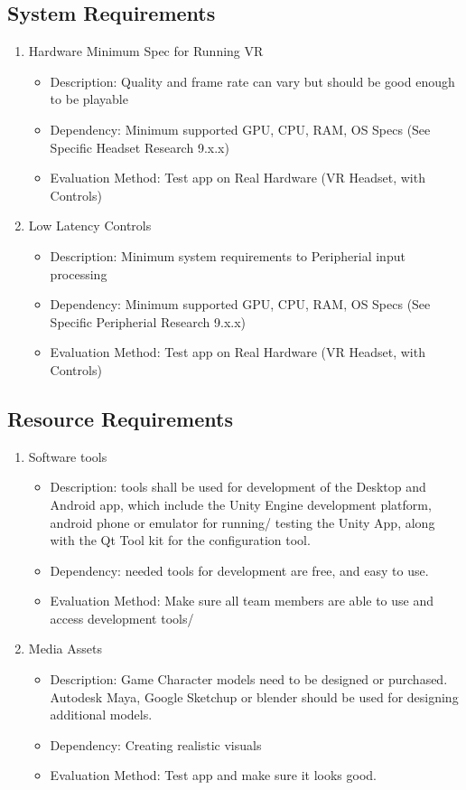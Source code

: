 \documentclass[a4paper,10pt]{article}
\begin{document}
	\subsection{System Requirements}
	\begin{enumerate}
	 \item Hardware Minimum Spec for Running VR
	 \begin{itemize}
	  \item Description: Quality and frame rate can vary but should be good enough to be playable
	  \item Dependency: Minimum supported GPU, CPU, RAM, OS Specs (See Specific Headset Research 9.x.x) 
	  \item Evaluation Method: Test app on Real Hardware (VR Headset, with Controls)
	 \end{itemize}
	 \item Low Latency Controls
	 \begin{itemize}
	  \item Description: Minimum system requirements to Peripherial input processing
	  \item Dependency: Minimum supported GPU, CPU, RAM, OS Specs (See Specific Peripherial Research 9.x.x) 
	  \item Evaluation Method: Test app on Real Hardware (VR Headset, with Controls)
	 \end{itemize}
	\end{enumerate}
	
	\subsection{Resource Requirements}
	\begin{enumerate}
	 \item Software tools
	 \begin{itemize}
	 \item Description: tools shall be used for development of the Desktop and Android app, which include 
	 the Unity Engine development platform, android phone or emulator for running/ testing the Unity App,
	  along with the Qt Tool kit for the configuration tool.
	 \item  Dependency: needed tools for development are free, and easy to use. 
	 \item Evaluation Method: Make sure all team members are able to use and access development tools/
	  \end{itemize}
	 \item Media Assets
	\begin{itemize}
	  \item Description: Game Character models need to be designed or purchased. Autodesk Maya, Google Sketchup or blender should be used for designing additional models. 
	  \item Dependency: Creating realistic visuals 
	  \item Evaluation Method: Test app and make sure it looks good.
	 \end{itemize}
	\end{enumerate}
\end{document}
